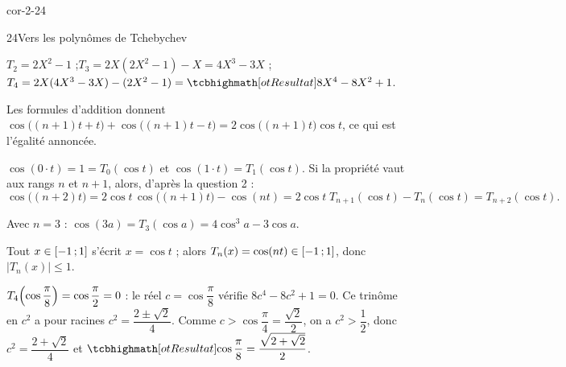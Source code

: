 \begin{blocLivre}{cor-2-24}
\begin{corrige}{24}{Vers les polynômes de Tchebychev}
\begin{questions}
  \item $T_2=2X^{2}-1$ ;\quad $T_3=2X(2X^{2}-1)-X=4X^{3}-3X$ ;\\
    $T_4=2X(4X^{3}-3X)-(2X^{2}-1)=\res{8X^{4}-8X^{2}+1}$.
  \item Les formules d'addition donnent
    $\cos\bigl((n+1)t+t\bigr)+\cos\bigl((n+1)t-t\bigr)=2\cos\bigl((n+1)t\bigr)\cos t$,
    ce qui est l'égalité annoncée.
  \item {} $\cos(0\cdot t)=1=T_0(\cos t)$ et
    $\cos(1\cdot t)=T_1(\cos t)$.
     Si la propriété vaut aux rangs $n$ et $n+1$,
    alors, d'après la question 2 :
    \[
      \cos\bigl((n+2)t\bigr)=2\cos t\,\cos\bigl((n+1)t\bigr)-\cos(nt)
      =2\cos t\;T_{n+1}(\cos t)-T_n(\cos t)=T_{n+2}(\cos t).
    \]
  \item Avec $n=3$ : $\cos(3a)=T_3(\cos a)=4\cos^{3}a-3\cos a$.
  \item Tout $x\in\mathopen{[}-1\,{;}\,1\mathclose{]}$ s'écrit $x=\cos t$ ; alors
    $T_n(x)=\cos(nt)\in\mathopen{[}-1\,{;}\,1\mathclose{]}$, donc $|T_n(x)|\leq1$.
  \item $T_4\Bigl(\cos\dfrac{\pi}{8}\Bigr)=\cos\dfrac{\pi}{2}=0$ : le réel
    $c=\cos\dfrac{\pi}{8}$ vérifie $8c^{4}-8c^{2}+1=0$. Ce trinôme en $c^{2}$
    a pour racines $c^{2}=\dfrac{2\pm\sqrt2}{4}$. Comme
    $c>\cos\dfrac{\pi}{4}=\dfrac{\sqrt2}{2}$, on a $c^{2}>\dfrac12$, donc
    $c^{2}=\dfrac{2+\sqrt2}{4}$ et
    $\res{\cos\dfrac{\pi}{8}=\dfrac{\sqrt{2+\sqrt2}}{2}}$.
\end{questions}
\end{corrige}
\end{blocLivre}


